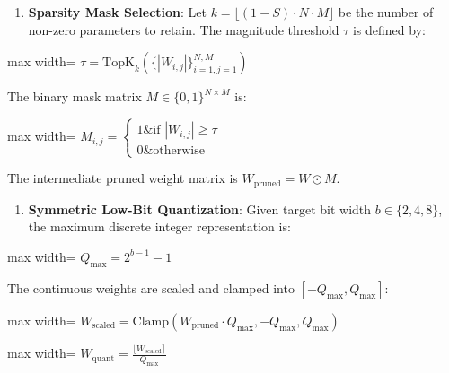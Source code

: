 \begin{enumerate}
\item \textbf{Sparsity Mask Selection}:
Let $k = \lfloor (1 - S) \cdot N \cdot M \rfloor$ be the number of non-zero parameters to retain. The magnitude threshold $\tau$ is defined by:
\end{enumerate}
\begin{center}
\begin{adjustbox}{max width=\columnwidth}
$\displaystyle
\tau = \text{TopK}_{k} \left( \{ |W_{i,j}| \}_{i=1, j=1}^{N, M} \right)
$
\end{adjustbox}
\end{center}
The binary mask matrix $M \in \{0, 1\}^{N \times M}$ is:
\begin{center}
\begin{adjustbox}{max width=\columnwidth}
$\displaystyle
M_{i,j} = \begin{cases} 1 \& \text{if } |W_{i,j}| \ge \tau \\ 0 \& \text{otherwise} \end{cases}
$
\end{adjustbox}
\end{center}
The intermediate pruned weight matrix is $W_{\text{pruned}} = W \odot M$.

\begin{enumerate}
\item \textbf{Symmetric Low-Bit Quantization}:
Given target bit width $b \in \{2, 4, 8\}$, the maximum discrete integer representation is:
\end{enumerate}
\begin{center}
\begin{adjustbox}{max width=\columnwidth}
$\displaystyle
Q_{\text{max}} = 2^{b - 1} - 1
$
\end{adjustbox}
\end{center}
The continuous weights are scaled and clamped into $[-Q_{\text{max}}, Q_{\text{max}}]$:
\begin{center}
\begin{adjustbox}{max width=\columnwidth}
$\displaystyle
W_{\text{scaled}} = \text{Clamp}\left( W_{\text{pruned}} \cdot Q_{\text{max}}, -Q_{\text{max}}, Q_{\text{max}} \right)
$
\end{adjustbox}
\end{center}
\begin{center}
\begin{adjustbox}{max width=\columnwidth}
$\displaystyle
W_{\text{quant}} = \frac{\lfloor W_{\text{scaled}} \rceil}{Q_{\text{max}}}
$
\end{adjustbox}
\end{center}


